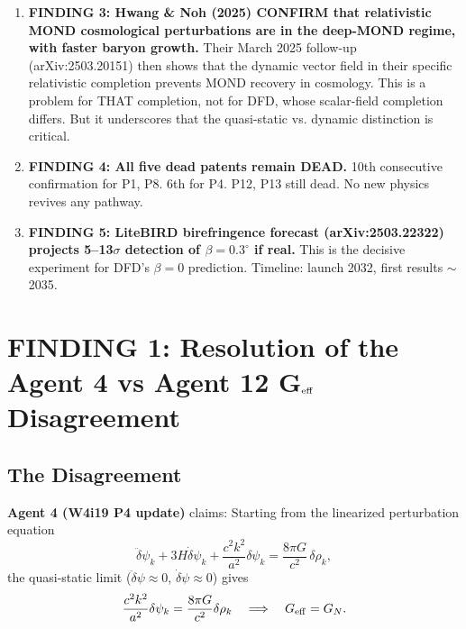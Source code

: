 \documentclass[11pt]{article}
\newcommand{\Geff}{G_{\rm eff}}
\newcommand{\GN}{G_N}
\newcommand{\dpsi}{\delta\psi}
\begin{document}
\begin{tcolorbox}[colback=red!5!white, colframe=red!70!black,
  title=\textbf{HONEST NEGATIVES FIRST}]
\begin{enumerate}
\item \textbf{FINDING 3: Hwang \& Noh (2025) CONFIRM that relativistic MOND
  cosmological perturbations are in the deep-MOND regime, with faster baryon
  growth.} Their March 2025 follow-up (arXiv:2503.20151) then shows that the
  dynamic vector field in their specific relativistic completion prevents MOND
  recovery in cosmology. This is a problem for THAT completion, not for DFD,
  whose scalar-field completion differs. But it underscores that the
  quasi-static vs. dynamic distinction is critical.

\item \textbf{FINDING 4: All five dead patents remain DEAD.} 10th consecutive
  confirmation for P1, P8. 6th for P4. P12, P13 still dead. No new physics
  revives any pathway.

\item \textbf{FINDING 5: LiteBIRD birefringence forecast (arXiv:2503.22322)
  projects 5--13$\sigma$ detection of $\beta = 0.3^\circ$ if real.} This is
  the decisive experiment for DFD's $\beta = 0$ prediction. Timeline:
  launch 2032, first results $\sim$2035.
\end{enumerate}
\end{tcolorbox}


\section{FINDING 1: Resolution of the Agent 4 vs Agent 12 G$_{\rm eff}$
Disagreement}
\label{sec:geff}

\subsection{The Disagreement}

\textbf{Agent 4 (W4i19 P4 update)} claims: Starting from the linearized
perturbation equation
\begin{equation}
\ddot\dpsi_k + 3H\dot\dpsi_k + \frac{c^2 k^2}{a^2}\dpsi_k
= \frac{8\pi G}{c^2}\,\delta\rho_k,
\label{eq:linear-wave}
\end{equation}
the quasi-static limit ($\ddot\dpsi \approx 0$, $\dot\dpsi \approx 0$)
gives
\begin{equation}
\frac{c^2 k^2}{a^2}\dpsi_k = \frac{8\pi G}{c^2}\delta\rho_k
\quad \Longrightarrow \quad \Geff = \GN.
\label{eq:agent4}
\end{equation}
\end{document}

